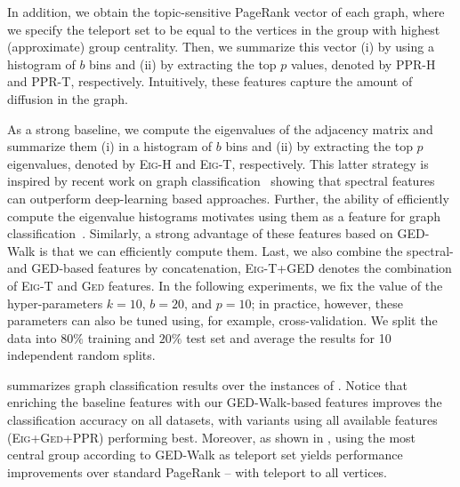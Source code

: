 In addition, we obtain the topic-sensitive PageRank vector of each graph, where
we specify the teleport set to be equal to the vertices in the group with highest
(approximate) group centrality. Then, we summarize this vector (i) by using  a histogram
of $b$ bins and (ii) by extracting the top $p$ values, denoted by \textsc{PPR-H}
and \textsc{PPR-T}, respectively. Intuitively, these features capture the amount of diffusion
in the graph.

As a strong baseline, we compute the eigenvalues of the adjacency matrix and
summarize them (i) in a histogram of $b$ bins and (ii) by extracting the top $p$
eigenvalues, denoted by \textsc{Eig-H} and \textsc{Eig-T}, respectively.
This latter strategy is inspired by recent work on graph
classification~\cite{galland2019invariant} showing that spectral features can outperform
deep-learning based approaches. Further, the ability of efficiently compute the
eigenvalue histograms motivates using them as a feature for graph
classification~\cite{DBLP:conf/kdd/DongBB19}.
Similarly, a strong advantage of these features based on GED-Walk is that we can
efficiently compute them.
Last, we also combine the spectral- and GED-based features by concatenation, \ie
\textsc{Eig-T+GED} denotes the combination of \textsc{Eig-T} and \textsc{Ged}
features.
%
In the following experiments, we fix the value of the hyper-parameters $k = 10$,
$b = 20$, and $p = 10$; in practice, however, these parameters can also be tuned
using, for example, cross-validation. We split the data into $80\%$ training
and $20\%$ test set and average the results for 10 independent random splits.

\begin{table}[tb]
\centering
\footnotesize
{}
\label{tab:ged-walk:graph-class}

\end{table}

 summarizes graph classification results over the instances
of .
Notice that enriching the baseline features with our GED-Walk-based features
improves the classification accuracy on all datasets, with variants
using all available features (\ie \textsc{Eig+Ged+PPR}) performing
best. Moreover, as shown in , using the most
central group according to GED-Walk as teleport set yields performance improvements
over standard PageRank -- \ie with teleport to all vertices.


